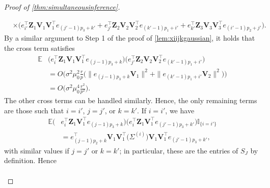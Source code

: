 \documentclass[10pt]{article}
\newcommand{\0}{{\mathbf{0}}}
\newcommand{\1}{{\mathbf{1}}}
\renewcommand{\t}{^{\top}}
\renewcommand{\hat}{\widehat}
\renewcommand{\hat}{\widehat}
\begin{document}
\begin{proof}[Proof of \cref{thm:simultaneousinference}]
\begin{itemize}
\begin{align*}
    &\times \bigg( {e}_{i'}^{\top} \mathbf{Z}_{1} \mathbf{V}_{1} \mathbf{V}_{1}^{\top} e_{(j'-1) p_{3}+k'}+e_{j'}^{\top} \mathbf{Z}_{2} \mathbf{V}_{2} \mathbf{V}_{2}^{\top} e_{(k'-1) p_{1}+i'}+e_{k'}^{\top} \mathbf{Z}_{3} \mathbf{V}_{3} \mathbf{V}_{3}^{\top} e_{(i'-1) p_{2}+j'} \bigg).
\end{align*}
By a similar argument to Step 1 of the proof of \cref{lem:xiijkgaussian}, it holds that the cross term satisfies
\begin{align*}
    \mathbb{E}&\bigg( e_i\t \mathbf{Z}_1 \mathbf{V}_1 \mathbf{V}_1\t e_{(j-1)p_3 + k}\bigg) \bigg( e_{j'}\t \mathbf{Z}_2 \mathbf{V}_2 \mathbf{V}_2\t e_{(k'-1)p_1 + i'} \bigg) \\
    &= O\bigg( \sigma^2 \mu_0^2 \frac{r}{p} \bigg( \| e_{(j-1)p_3 + k} \mathbf{V}_1 \|^2 + \| e_{(k'-1)p_1 + i'} \mathbf{V}_2 \|^2 \bigg) \bigg) \\
    &= O\bigg(  \sigma^2 \mu_0^4 \frac{r^2}{p^2}  \bigg).
\end{align*}
The other cross terms can be handled similarly.  Hence, the only remaining terms are those such that $i = i'$, $j = j'$, or $k = k'$.  If $i= i'$, we have
\begin{align*}
    \mathbb{E}\bigg( &e_i\t \mathbf{Z}_1 \mathbf{V}_1\t e_{(j-1)p_3 + k} \bigg)\bigg( e_i\t \mathbf{Z}_1 \mathbf{V}_1\t e_{(j'-1)p_3 + k'} \bigg) \mathbb{I}_{\{i=i'\}}\\
    &=  e_{(j-1)p_2 + k}\t \mathbf{V}_1 \mathbf{V}_1\t \big( \Sigma^{(i)} \big)  \mathbf{V}_1 \mathbf{V}_1\t e_{(j'-1)p_3 + k'},
\end{align*}
with similar values if $j = j'$ or $k = k'$; in particular, these are the entries of $S_J$ by definition.  Hence
\begin{align}

\end{align}
\end{itemize}
\end{proof}
\end{document}
